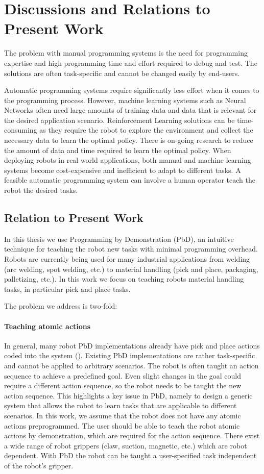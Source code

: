 \section{Discussions and Relations to Present Work}
The problem with manual programming systems is the need for programming expertise and high programming time and effort required to debug and test.
The solutions are often task-specific and cannot be changed easily by end-users.

Automatic programming systems require significantly less effort when it comes to the programming process. 
However, machine learning systems such as Neural Networks often need large amounts of training data and data that is relevant for the desired application scenario.
Reinforcement Learning solutions can be time-consuming as they require the robot to explore the environment and collect the necessary data to learn the optimal policy.
There is on-going research to reduce the amount of data and time required to learn the optimal policy.
When deploying robots in real world applications, both manual and machine learning systems become cost-expensive and inefficient to adapt to different tasks.
A feasible automatic programming system can involve a human operator teach the robot the desired tasks.


\subsection{Relation to Present Work}
In this thesis we use Programming by Demonstration (PbD), an intuitive technique for teaching the robot new tasks with minimal programming overhead.
Robots are currently being used for many industrial applications from welding (arc welding, spot welding, etc.) to material handling (pick and place, packaging, palletizing, etc.).
In this work we focus on teaching robots material handling tasks, in particular pick and place tasks.

The problem we address is two-fold:
\paragraph{Teaching atomic actions}
In general, many robot PbD implementations already have pick and place actions coded into the system (\cite{veeraraghavan2008teaching}).
Existing PbD implementations are rather task-specific and cannot be applied to arbitrary scenarios.
The robot is often taught an action sequence to achieve a predefined goal.
Even slight changes in the goal could require a different action sequence, so the robot needs to be taught the new action sequence.
This highlights a key issue in PbD, namely to design a generic system that allows the robot to learn tasks that are applicable to different scenarios.
In this work, we assume that the robot does not have any atomic actions preprogrammed.
The user should be able to teach the robot atomic actions by demonstration, which are required for the action sequence.
There exist a wide range of robot grippers (claw, suction, magnetic, etc.) which are robot dependent.
With PbD the robot can be taught a user-specified task independent of the robot's gripper.

